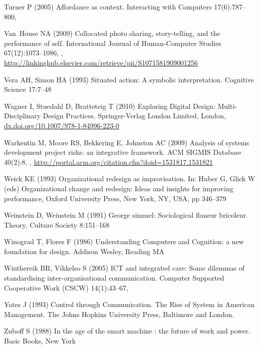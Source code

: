 \documentclass{article}
\begin{document}
\begin{thebibliography}{193}
Turner P (2005) Affordance as context. Interacting with Computers
  17(6):787--800, 

Van~House NA (2009) Collocated photo sharing, story-telling, and the
  performance of self. International Journal of Human-Computer Studies
  67(12):1073--1086, ,
  \urlprefix\url{http://linkinghub.elsevier.com/retrieve/pii/S1071581909001256}

Vera AH, Simon HA (1993) Situated action: A symbolic interpretation. Cognitive
  Science 17:7--48

Wagner I, Stuedahl D, Bratteteig T (2010) Exploring Digital Design:
  Multi-Disciplinary Design Practices. Springer-Verlag London Limited, London,
  \urlprefix\url{dx.doi.org/10.1007/978-1-84996-223-0}

Warkentin M, Moore RS, Bekkering E, Johnston AC (2009) Analysis of systems
  development project risks: an integrative framework. {ACM} {SIGMIS} Database
  40(2):8, ,
  \urlprefix\url{http://portal.acm.org/citation.cfm?doid=1531817.1531821}

Weick KE (1993) Organizational redesign as improvisation. In: Huber G, Glick W
  (eds) Organizational change and redesign: Ideas and insights for improving
  performance, Oxford University Press, New York, {NY}, {USA}, pp 346--379

Weinstein D, Weinstein M (1991) George simmel: Sociological flaneur bricoleur.
  Theory, Culture Society 8:151--168

Winograd T, Flores F (1986) Understanding Computers and Cognition: a new
  foundation for design. Addison Wesley, Reading {MA}

Winthereik BR, Vikkelso S (2005) {ICT} and integrated care: Some dilemmas of
  standardising inter-organisational communication. Computer Supported
  Cooperative Work {(CSCW)} 14(1):43--67,

Yates J (1993) Control through Communication. The Rise of System in American
  Management. The Johns Hopkins University Press, Baltimore and London.

Zuboff S (1988) In the age of the smart machine : the future of work and power.
  Basic Books, New York

\end{thebibliography}
\end{document}
